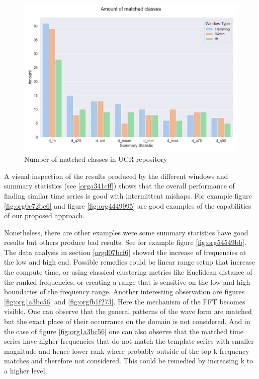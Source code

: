 \documentclass[phd,black, hidelinks]{PrincetonThesis}
\begin{document}
\begin{figure}[htbp]
\centering
\includegraphics[width=.9\linewidth]{./img/fft_matched_cls.png}
\caption{\label{fig:org22b36a8}Number of matched classes in UCR repository}
\end{figure}

A visual inspection of the results produced by the different windows and summary statistics (see \ref{orga341cff}) shows that the overall performance of finding similar time series is good with intermittent mishaps. For example figure \ref{fig:org0c72bc6} and figure \ref{fig:org4449995} are good examples of the capabilities of our proposed approach.

Nonetheless, there are other examples were some summary statistics have good results but others produce bad results. See for example figure \ref{fig:org54549bb}. The data analysis in section \ref{orgd07bcf6} showed the increase of frequencies at the low and high end. Possible remedies could be linear range setup that increase the compute time, or using classical clustering metrics like Euclidean distance of the ranked frequencies, or creating a range that is sensitive on the low and high boundaries of the frequency range. Another interesting observation are figures \ref{fig:org1a3bc56} and \ref{fig:orgfb1f273}. Here the mechanism of the FFT becomes visible. One can observe that the general patterns of the wave form are matched but the exact place of their occurrance on the domain is not considered. And in the case of figure \ref{fig:org1a3bc56} one can also observe that the matched time series have higher frequencies that do not match the template series with smaller magnitude and hence lower rank where probably outside of the top k frequency matches and therefore not considered. This could be remedied by increasing k to a higher level.
\end{document}
